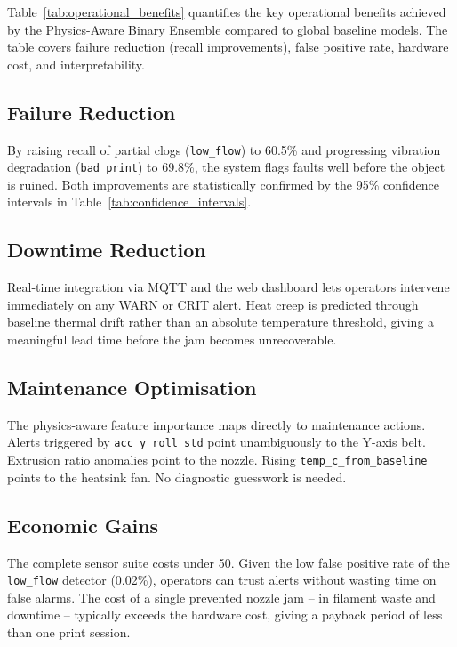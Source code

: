 Table~\ref{tab:operational_benefits} quantifies the key operational benefits achieved by
the Physics-Aware Binary Ensemble compared to global baseline models. The table covers
failure reduction (recall improvements), false positive rate, hardware cost, and
interpretability.

\begin{table}[H]
\centering
\caption{Quantified operational benefits of the Physics-Aware Binary Ensemble}
\label{tab:operational_benefits}

\end{table}

\subsection{Failure Reduction}

By raising recall of partial clogs (\texttt{low\_flow}) to 60.5\% and progressing
vibration degradation (\texttt{bad\_print}) to 69.8\%, the system flags faults well before
the object is ruined. Both improvements are statistically confirmed by the 95\% confidence
intervals in Table~\ref{tab:confidence_intervals}.

\subsection{Downtime Reduction}

Real-time integration via MQTT and the web dashboard lets operators intervene immediately
on any WARN or CRIT alert. Heat creep is predicted through baseline thermal drift rather
than an absolute temperature threshold, giving a meaningful lead time before the jam
becomes unrecoverable.

\subsection{Maintenance Optimisation}

The physics-aware feature importance maps directly to maintenance actions. Alerts
triggered by \texttt{acc\_y\_roll\_std} point unambiguously to the Y-axis belt. Extrusion
ratio anomalies point to the nozzle. Rising \texttt{temp\_c\_from\_baseline} points to the
heatsink fan. No diagnostic guesswork is needed.

\subsection{Economic Gains}

The complete sensor suite costs under \texteuro{}50. Given the low false positive rate of
the \texttt{low\_flow} detector (0.02\%), operators can trust alerts without wasting time on
false alarms. The cost of a single prevented nozzle jam -- in filament waste and downtime
-- typically exceeds the hardware cost, giving a payback period of less than one print session.

\endinput